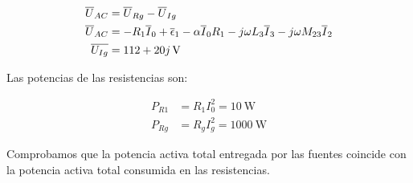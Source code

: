 \documentclass[12pt]{article}
\begin{document}
\begin{align*}
  \overline{U}_{AC} &= \overline{U}_{Rg} - \overline{U}_{Ig}\\
  \overline{U}_{AC} &= - R_1 \overline{I}_0 + \overline{\epsilon}_1 - \alpha \overline{I}_0 R_1 - j \omega L_3 \overline{I}_3 - j \omega M_{23} \overline{I}_2\\
  \overline{U_{Ig}} &= \SI[parse-numbers=false]{112 + 20j}{\volt}
\end{align*}
  
Las potencias de las resistencias son:

\begin{align*}
  P_{R1} &= R_1 I_0^2 = \SI{10}{\watt}\\ 
  P_{Rg} &= R_g I_g^2 = \SI{1000}{\watt}
\end{align*}

Comprobamos que la potencia activa total entregada por las fuentes coincide con la potencia activa total consumida en las resistencias.
\end{document}

